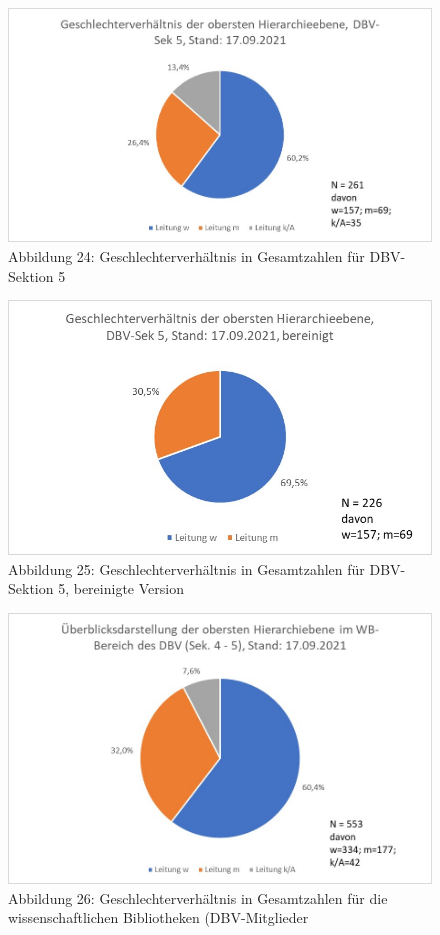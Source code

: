 \documentclass[a4paper,
fontsize=11pt,
oneside,
numbers=noperiodatend,
parskip=half-,
bibliography=totoc,
final
]{scrartcl}
\begin{document}
\begin{figure}
\centering
\includegraphics{img/Abb.24_DBV-Sek5_gesamt.jpg}
\caption{Abbildung 24: Geschlechterverhältnis in Gesamtzahlen für
DBV-Sektion 5}
\end{figure}

\begin{figure}
\centering
\includegraphics{img/Abb.25_DBV-Sek5_gesamt_bereinigt.jpg}
\caption{Abbildung 25: Geschlechterverhältnis in Gesamtzahlen für
DBV-Sektion 5, bereinigte Version}
\end{figure}

\begin{figure}
\centering
\includegraphics{img/Abb.26_DBV-Sek4-5_gesamt.jpg}
\caption{Abbildung 26: Geschlechterverhältnis in Gesamtzahlen für die
wissenschaftlichen Bibliotheken (DBV-Mitglieder}
\end{figure}
\end{document}
